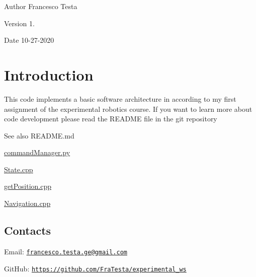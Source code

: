 \begin{DoxyAuthor}{Author}
Francesco Testa 
\end{DoxyAuthor}
\begin{DoxyVersion}{Version}
1. 
\end{DoxyVersion}
\begin{DoxyDate}{Date}
10-\/27-\/2020
\end{DoxyDate}
\hypertarget{index_Introduction}{}\section{Introduction}\label{index_Introduction}
This code implements a basic software architecture in according to my first assignment of the experimental robotics course. If you want to learn more about code development please read the R\+E\+A\+D\+ME file in the git repository \begin{DoxySeeAlso}{See also}
R\+E\+A\+D\+M\+E.\+md 

\hyperlink{commandManager_8py}{command\+Manager.\+py} 

\hyperlink{State_8cpp}{State.\+cpp} 

\hyperlink{getPosition_8cpp}{get\+Position.\+cpp} 

\hyperlink{Navigation_8cpp}{Navigation.\+cpp} 
\end{DoxySeeAlso}
\hypertarget{index_Contacts}{}\subsection{Contacts}\label{index_Contacts}
Email\+: \href{mailto:francesco.testa.ge@gmail.com}{\tt francesco.\+testa.\+ge@gmail.\+com}

Git\+Hub\+: \href{https://github.com/FraTesta/experimental_ws}{\tt https\+://github.\+com/\+Fra\+Testa/experimental\+\_\+ws} 